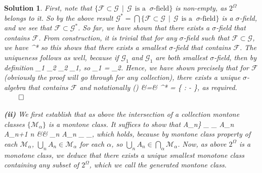 \documentclass{article} %
\def\eQb#1\eQe{\begin{eqnarray*}#1\end{eqnarray*}}
\theoremstyle{quest}
\newtheorem*{solution}{Solution}
\begin{document}
\begin{solution}
First, note that $\{\mathscr{F} \subset \mathscr{G} \>\> | \>\>
\mathscr{G} \>\> \text{is a } \> \sigma \text{-field} \}$ 
is non-empty, as $2^{\Omega}$ 
belongs to it. So by the above result $
\mathscr{G}^* = \bigcap \{ \mathscr{F} \subset \mathscr{G} \>\> | \>\> 
\mathscr{G} \>\> \text{is a } \> \sigma \text{-field} \}$ is a $\sigma$-field,
and we see that $\mathscr{F} \subset \mathscr{G}^*$. So far, we have shown that
there exists a $\sigma$-field that contains $\mathscr{F}$. 
From construction, it is trivial that for any $\sigma$-field such that 
$\mathscr{F} \subset  \mathscr{G}$, we have
\eQb
\mathscr{G}^* \subset {}
\eQe
so this shows that there exists a smallest $\sigma$-field that contains
$\mathscr{F}$. The uniqueness follows as well, because if $\mathscr{G}_1$
and $\mathscr{G}_1$ are both smallest $\sigma$-field, then by definition
\eQb
\mathscr{G}_1 \subset {}_2 \>\>  \>\> _2
\subset {}_1,
\eQe
so
\eQb
\mathscr{G}_1 = _2.
\eQe
Hence, we have shown precisely that for $\mathscr{F}$ (obviously the proof will go
through for any collection), there exists a unique $\sigma$-algebra that 
contains $\mathscr{F}$ and 
notationally  
\eQb
\sigma() &=& 
^* = 
\{  \subset {} :  \> 
 \sigma- \},
\eQe 
as required. \hfill $\qed$ 

\bigskip

\textbf{(ii)} We first establish that as above the intersection of
a collection montone classes $\{ \mathscr{M}_{\alpha} 
\}$ is a montone class. It suffices to 
show that 
\eQb
\{ A_{n}\} \subset \bigcap_{\alpha} _{\alpha} \>\>
 \>\> A_n \subset A_{n+1} \>\> \forall n  
&\implies& \bigcup_{n} A_n \in \bigcap_{\alpha} _{\alpha},  
\eQe
which holds, because by montone class property of each $\mathscr{M}_{\alpha}$,
$\bigcup_{n} A_n \in \mathscr{M}_{\alpha}$ for each $\alpha$, so 
$\bigcup_{n} A_n \in \bigcap_{\alpha} \mathscr{M}_{\alpha}$. Now, 
as above $2^{\Omega}$ is a monotone class, we deduce that there exists
a unique smallest monotone class containing any subset of $2^{\Omega}$, which 
we call the generated montone class.  


\end{solution}
\end{document}
